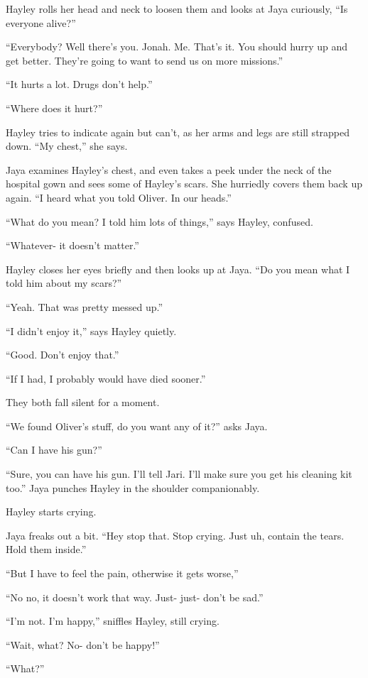 Hayley rolls her head and neck to loosen them and looks at Jaya curiously, ``Is everyone alive?''

``Everybody?  Well there's you.  Jonah.  Me.   That's it.  You should hurry up and get better.  They're going to want to send us on more missions.''

``It hurts a lot.  Drugs don't help.''

``Where does it hurt?''

Hayley tries to indicate again but can't, as her arms and legs are still strapped down.  ``My chest,'' she says.

Jaya examines Hayley's chest, and even takes a peek under the neck of the hospital gown and sees some of Hayley's scars.  She hurriedly covers them back up again.  ``I heard what you told Oliver.  In our heads.''

``What do you mean?  I told him lots of things,'' says Hayley, confused.

``Whatever- it doesn't matter.''

Hayley closes her eyes briefly and then looks up at Jaya.  ``Do you mean what I told him about my scars?''

``Yeah.  That was pretty messed up.''

``I didn't enjoy it,'' says Hayley quietly.

``Good.  Don't enjoy that.''

``If I had, I probably would have died sooner.''

They both fall silent for a moment.

``We found Oliver's stuff, do you want any of it?'' asks Jaya.

``Can I have his gun?''

``Sure, you can have his gun.  I'll tell Jari.  I'll make sure you get his cleaning kit too.'' Jaya punches Hayley in the shoulder companionably.

Hayley starts crying.

Jaya freaks out a bit.  ``Hey stop that.  Stop crying.  Just uh, contain the tears.  Hold them inside.''

``But I have to feel the pain, otherwise it gets worse,''

``No no, it doesn't work that way.  Just- just- don't be sad.''

``I'm not.  I'm happy,'' sniffles Hayley, still crying.

``Wait, what?  No- don't be happy!''

``What?''

